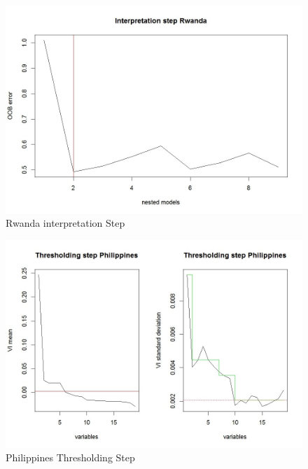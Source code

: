\documentclass[12pt,a4paper,english]{article}
\begin{document}
\FloatBarrier
\begin{figure}[!htb]
\begin{center}
\includegraphics[scale=0.50]{F4.jpg}
\caption{Rwanda interpretation Step}
\label{figure15}
\end{center}
\end{figure}
\FloatBarrier

\FloatBarrier
\begin{figure}[!htb]
\begin{center}
\includegraphics[scale=0.50]{F5.jpg}
\caption{Philippines Thresholding Step}
\label{figure16}
\end{center}
\end{figure}
\FloatBarrier
\end{document}
